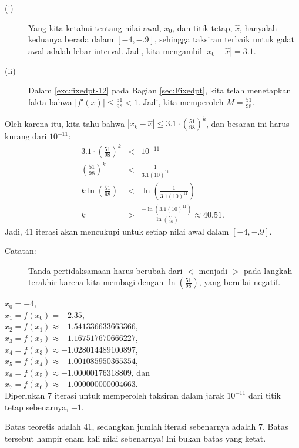 \begin{description}
\begin{description}
\begin{description}
\item [{(i)}] Yang kita ketahui tentang nilai awal, $x_{0}$, dan titik
tetap, $\hat{x}$, hanyalah keduanya berada dalam $[-4,-.9]$, sehingga
taksiran terbaik untuk galat awal adalah lebar interval. Jadi, kita
mengambil $|x_{0}-\hat{x}|=3.1$. 
\item [{(ii)}] Dalam \ref{exc:fixedpt-12} pada Bagian \ref{sec:Fixedpt},
kita telah menetapkan fakta bahwa $|f'(x)|\leq\frac{51}{98}<1$. Jadi,
kita memperoleh $M=\frac{51}{98}$.
\end{description}
Oleh karena itu, kita tahu bahwa $|x_{k}-\hat{x}|\leq3.1\cdot\left(\frac{51}{98}\right)^{k}$,
dan besaran ini harus kurang dari $10^{-11}$:
\begin{eqnarray*}
3.1\cdot\left(\frac{51}{98}\right)^{k} & < & 10^{-11}\\
\left(\frac{51}{98}\right)^{k} & < & \frac{1}{3.1(10)^{11}}\\
k\ln\left(\frac{51}{98}\right) & < & \ln\left(\frac{1}{3.1(10)^{11}}\right)\\
k & > & \frac{-\ln\left(3.1(10)^{11}\right)}{\ln\left(\frac{51}{98}\right)}\approx40.51.
\end{eqnarray*}
Jadi, 41 iterasi akan mencukupi untuk setiap nilai awal dalam $[-4,-.9]$.
\begin{description}
\item [{Catatan:}] Tanda pertidaksamaan harus berubah dari $<$ menjadi
$>$ pada langkah terakhir karena kita membagi dengan $\ln\left(\frac{51}{98}\right)$,
yang bernilai negatif. 
\end{description}
\item [{(b)}] $x_{0}=-4$,\\
$x_{1}=f(x_{0})=-2.35$,\\
$x_{2}=f(x_{1})\approx-1.541336633663366$,\\
$x_{3}=f(x_{2})\approx-1.167517670666227$,\\
$x_{4}=f(x_{3})\approx-1.028014489100897$,\\
$x_{5}=f(x_{4})\approx-1.001085950365354$,\\
$x_{6}=f(x_{5})\approx-1.00000176318809$, dan\\
$x_{7}=f(x_{6})\approx-1.000000000004663$.\\
Diperlukan 7 iterasi untuk memperoleh taksiran dalam jarak $10^{-11}$
dari titik tetap sebenarnya, $-1$.
\item [{(c)}] Batas teoretis adalah 41, sedangkan jumlah iterasi sebenarnya
adalah 7. Batas tersebut hampir enam kali nilai sebenarnya! Ini bukan
batas yang ketat.


\end{description}
\end{description}
